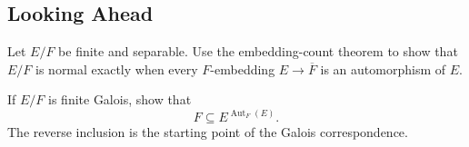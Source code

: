 \subsection*{Looking Ahead}
\begin{exercise}[Challenging] Let \(E/F\) be finite and separable.  Use the
embedding-count theorem to show that \(E/F\) is normal exactly when every
\(F\)-embedding \(E\to\overline F\) is an automorphism of \(E\).
\end{exercise}
\begin{exercise} If \(E/F\) is finite Galois, show that
\[
F\subseteq E^{\operatorname{Aut}_F(E)}.
\]
The reverse inclusion is the starting point of the Galois correspondence.
\end{exercise}
